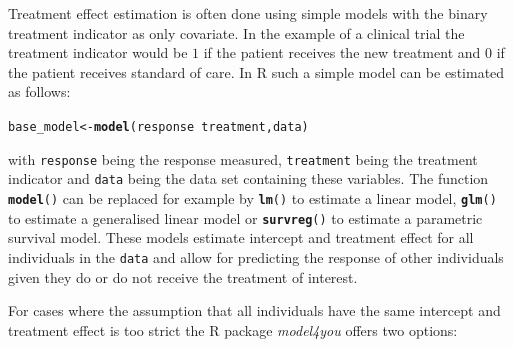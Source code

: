 \documentclass{josr}\usepackage[]{graphicx}\usepackage[]{color}
\makeatletter
\newcommand{\hlopt}[1]{\textcolor[rgb]{0,0,0}{#1}}%
\newcommand{\hlstd}[1]{\textcolor[rgb]{0.345,0.345,0.345}{#1}}%
\newcommand{\hlkwb}[1]{\textcolor[rgb]{0.69,0.353,0.396}{#1}}%
\newcommand{\hlkwd}[1]{\textcolor[rgb]{0.737,0.353,0.396}{\textbf{#1}}}%
\newenvironment{kframe}{%
 \def\at@end@of@kframe{}%
 \ifinner\ifhmode%
  \def\at@end@of@kframe{\end{minipage}}%
  \begin{minipage}{\columnwidth}%
 \fi\fi%
 \def\FrameCommand##1{\hskip\@totalleftmargin \hskip-\fboxsep
 \colorbox{shadecolor}{##1}\hskip-\fboxsep
     \hskip-\linewidth \hskip-\@totalleftmargin \hskip\columnwidth}%
 \MakeFramed {\advance\hsize-\width
   \@totalleftmargin\z@ \linewidth\hsize
   \@setminipage}}%
 {\par\unskip\endMakeFramed%
 \at@end@of@kframe}
\newenvironment{knitrout}{}{} %
\makeatother
\begin{document}
Treatment effect estimation is often done using simple models with the binary
treatment indicator as only covariate. In the example of a clinical trial the
treatment indicator would be $1$ if the patient receives the new treatment and
$0$ if the patient receives standard of care.  In R such a simple model can be
estimated as follows:
\begin{knitrout}
\color{fgcolor}\begin{kframe}
\begin{alltt}
\hlstd{base_model} \hlkwb{<-} \hlkwd{model}\hlstd{(response} \hlopt{~} \hlstd{treatment, data)}
\end{alltt}
\end{kframe}
\end{knitrout}
with \texttt{\hlstd{response}} being the response measured, \texttt{\hlstd{treatment}} being
the treatment indicator and \texttt{\hlstd{data}} being the data set containing these
variables.  The function \texttt{\hlkwd{model}\hlstd{()}} can be replaced for example by
\texttt{\hlkwd{lm}\hlstd{()}} to estimate a linear model, \texttt{\hlkwd{glm}\hlstd{()}} to estimate a
generalised linear model or \texttt{\hlkwd{survreg}\hlstd{()}} to estimate a parametric
survival model.  These models estimate intercept and treatment effect for all
individuals in the \texttt{\hlstd{data}} and allow for predicting the response of
other individuals given they do or do not receive the treatment of interest.

For cases where the assumption that all individuals have the same intercept and
treatment effect is too strict the R package \emph{model4you} offers two
options:
\end{document}
